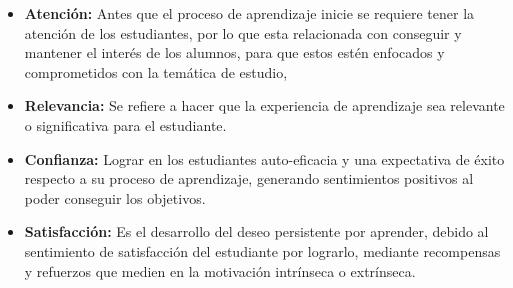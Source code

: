 \begin{itemize}
\item \textbf{Atención:} Antes que el proceso de aprendizaje inicie se requiere tener la atención de los 
estudiantes, por lo que esta relacionada con conseguir y mantener el interés de los alumnos, para que estos 
estén enfocados y comprometidos con la temática de estudio,
\item \textbf{Relevancia:} Se refiere a hacer que la experiencia de aprendizaje sea relevante o significativa 
para el estudiante.
\item \textbf{Confianza:} Lograr en los estudiantes auto-eficacia y una expectativa de éxito respecto a su 
proceso de aprendizaje, generando sentimientos positivos al poder conseguir los objetivos.
\item \textbf{Satisfacción:} Es el desarrollo del deseo persistente por aprender, debido al sentimiento de 
satisfacción del estudiante por lograrlo, mediante recompensas y refuerzos que medien en la motivación 
intrínseca o extrínseca.
\end{itemize}


